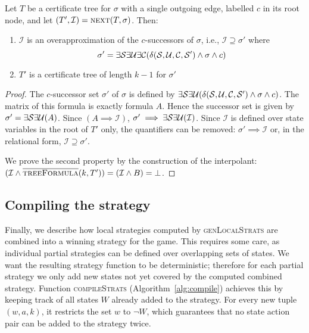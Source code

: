 \begin{proposition}\label{prop:next}
    Let $T$ be a certificate tree for $\sigma$ with a single outgoing edge, labelled $c$ in its root node, and let $(T',\mathcal{I})
    = \textsc{next}(T,\sigma)$.
    Then:
    \begin{enumerate}
        \item $\mathcal{I}$ is an overapproximation of the $c$-successors of $\sigma$, i.e., $\mathcal{I} \supseteq \sigma'$ where $$\sigma' = \exists \mathcal{S} \exists \mathcal{U} \exists \mathcal{C} (\delta(\mathcal{S}, \mathcal{U}, \mathcal{C}, \mathcal{S}') \land \sigma \land c)$$
        \item $T'$ is a certificate tree of length $k-1$ for $\sigma'$
    \end{enumerate}
\end{proposition}
\begin{proof}
    The $c$-successor set $\sigma'$ of $\sigma$ is defined by $\exists \mathcal{S} \exists \mathcal{U} (\delta(\mathcal{S}, \mathcal{U}, \mathcal{C}, \mathcal{S}') \land \sigma \land c)$. The matrix of this formula is exactly formula $A$.  Hence the successor set is given by $\sigma' = \exists \mathcal{S} \exists \mathcal{U} (A)$.  Since $(A \implies \mathcal{I})$, $\sigma' \implies \exists \mathcal{S} \exists \mathcal{U} (\mathcal{I})$.  Since $\mathcal{I}$ is defined over state variables in the root of $T'$ only, the quantifiers can be removed: $\sigma' \implies \mathcal{I}$ or, in the relational form, $\mathcal{I} \supseteq \sigma'$.
    
    We prove the second property by the construction of the interpolant: $(\mathcal{I} \land \textsc{$\overline{\mbox{treeFormula}}$}(k, T')) = (\mathcal{I} \land B) = \bot$.
\end{proof}

\subsection{Compiling the strategy}

Finally, we describe how local strategies computed by \textsc{genLocalStrats} are combined into a winning strategy for the game.  This requires some care, as individual partial strategies can be defined over overlapping sets of states.  We want the resulting strategy function to be deterministic; therefore for each partial strategy we only add new states not yet covered by the computed combined strategy.  Function \textsc{compileStrats} (Algorithm~\ref{alg:compile}) achieves this by keeping track of all states $W$ already added to the strategy.  For every new tuple $(w, a, k)$, it restricts the set $w$ to $\neg W$, which guarantees that no state action pair can be added to the strategy twice.  

